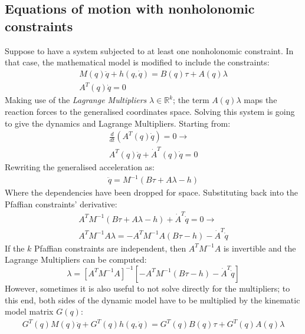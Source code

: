 \begin{itemize}
    \section{Equations of motion with nonholonomic constraints}
    Suppose to have a system subjected to at least one nonholonomic constraint. In that case, the mathematical model is modified to include the constraints:
    \begin{gather}\label{nonholo_model}
        M(q)\ddot{q}+h(q,\dot{q})=B(q)\tau+A(q)\lambda \\
        A^{T}(q)\dot{q}=0
    \end{gather}
    Making use of the \textit{Lagrange Multipliers} $\lambda\in\mathbb{R}^{k}$; the term $A(q)\lambda$ maps the reaction forces to the generalised coordinates space. Solving this system is going to give the dynamics and Lagrange Multipliers. Starting from:
    \begin{gather*}
        \frac{d}{dt}\left(A^T(q)\dot{q}\right)=0\rightarrow \\
        A^{T}(q)\ddot{q}+\dot{A}^{T}(q)\dot{q}=0
    \end{gather*}
    Rewriting the generalised acceleration as:
    \begin{gather*}
        \ddot{q}=M^{-1}\left( B\tau+A\lambda-h \right)
    \end{gather*}
    Where the dependencies have been dropped for space. Substituting back into the Pfaffian constraints' derivative:
    \begin{gather*}
        A^{T}M^{-1}\left(B\tau+A\lambda-h\right)+\dot{A}^{T}\dot{q}=0 \rightarrow \\
        A^{T}M^{-1}A\lambda=-A^{T}M^{-1}A\left(B\tau-h\right)-\dot{A}^{T}\dot{q}
    \end{gather*}
    If the $k$ Pfaffian constraints are independent, then $A^{T}M^{-1}A$ is invertible and the Lagrange Multipliers can be computed:
    \begin{equation}\label{lagrange_mult_comp}
        \lambda=\left[A^{T}M^{-1}A\right]^{-1}\left[-A^{T}M^{-1}\left(B\tau-h\right)-\dot{A}^{T}\dot{q}\right]
    \end{equation}
    However, sometimes it is also useful to not solve directly for the multipliers; to this end, both sides of the dynamic model have to be multiplied by the kinematic model matrix $G(q)$:
    \begin{gather*}
        G^{T}(q)M(q)\ddot{q}+G^{T}(q)h(q,\dot{q})=G^{T}(q)B(q)\tau+G^{T}(q)A(q)\lambda
    \end{gather*}

\end{itemize}
